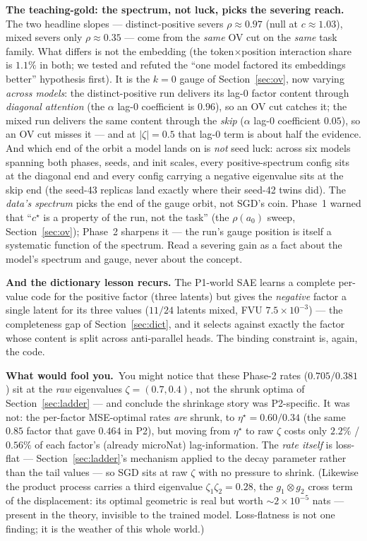\documentclass[11pt]{article}
\newcommand{\pzeta}{\zeta}
\newcommand{\fool}[1]{\par\smallskip\noindent%
  \textbf{\textcolor{red!60!black}{What would fool you.}}~#1\par\smallskip}
\begin{document}
\textbf{The teaching-gold: the spectrum, not luck, picks the severing reach.}
The two headline slopes --- distinct-positive severs $\rho\approx0.97$ (null at
$c\approx1.03$), mixed severs only $\rho\approx0.35$ --- come from the
\emph{same} OV cut on the \emph{same} task family. What differs is not the
embedding (the token$\times$position interaction share is $1.1\%$ in both; we
tested and refuted the ``one model factored its embeddings better'' hypothesis
first). It is the $k{=}0$ gauge of Section~\ref{sec:ov}, now varying
\emph{across models}: the distinct-positive run delivers its lag-0 factor
content through \emph{diagonal attention} (the $\alpha$ lag-0 coefficient is
$0.96$), so an OV cut catches it; the mixed run delivers the same content
through the \emph{skip} ($\alpha$ lag-0 coefficient $0.05$), so an OV cut misses
it --- and at $|\pzeta|=0.5$ that lag-0 term is about half the evidence. And
which end of the orbit a model lands on is \emph{not} seed luck: across six
models spanning both phases, seeds, and init scales, every positive-spectrum
config sits at the diagonal end and every config carrying a negative eigenvalue
sits at the skip end (the seed-43 replicas land exactly where their seed-42
twins did). The \emph{data's spectrum} picks the end of the gauge orbit, not
SGD's coin. Phase~1 warned that ``$c^\star$ is a property of the run, not the
task'' (the $\rho(a_0)$ sweep, Section~\ref{sec:ov}); Phase~2 sharpens it --- the
run's gauge position is itself a systematic function of the spectrum. Read a
severing gain as a fact about the model's spectrum and gauge, never about the
concept.

\textbf{And the dictionary lesson recurs.} The P1-world SAE learns a complete
per-value code for the positive factor (three latents) but gives the
\emph{negative} factor a single latent for its three values ($11/24$ latents
mixed, FVU $7.5\times10^{-3}$) --- the completeness gap of
Section~\ref{sec:dict}, and it selects against exactly the factor whose content
is split across anti-parallel heads. The binding constraint is, again, the
code.

\fool{You might notice that these Phase-2 rates ($0.705/0.381$) sit at the
\emph{raw} eigenvalues $\pzeta=(0.7,0.4)$, not the shrunk optima of
Section~\ref{sec:ladder} --- and conclude the shrinkage story was P2-specific.
It was not: the per-factor MSE-optimal rates \emph{are} shrunk, to
$\eta^\star=0.60/0.34$ (the same $0.85$ factor that gave $0.464$ in P2), but
moving from $\eta^\star$ to raw $\pzeta$ costs only $2.2\%$ / $0.56\%$ of each
factor's (already microNat) lag-information. The \emph{rate itself} is loss-flat
--- Section~\ref{sec:ladder}'s mechanism applied to the decay parameter rather
than the tail values --- so SGD sits at raw $\pzeta$ with no pressure to shrink.
(Likewise the product process carries a third eigenvalue $\pzeta_1\pzeta_2=0.28$,
the $g_1\!\otimes\!g_2$ cross term of the displacement: its optimal geometric is
real but worth $\sim2\times10^{-5}$ nats --- present in the theory, invisible to
the trained model. Loss-flatness is not one finding; it is the weather of this
whole world.)}
\end{document}
